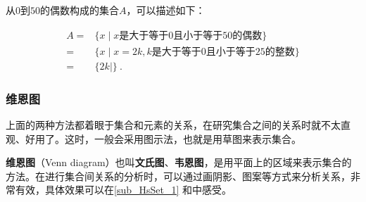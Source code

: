 

\begin{example}{}

从$0$到$50$的偶数构成的集合$A$，可以描述如下：

\begin{equation}
\begin{aligned}
A={}&\{x \mid x\text{是大于等于}0\text{且小于等于}50\text{的偶数}\}\\
={}&\{x \mid x=2k,k\text{是大于等于}0\text{且小于等于}25\text{的整数}\}\\
={}&\{2k\mid\}~.
\end{aligned}
\end{equation}
\end{example}

\subsubsection{维恩图}
上面的两种方法都着眼于集合和元素的关系，在研究集合之间的关系时就不太直观、好用了。这时，一般会采用图示法，也就是用草图来表示集合。

\textbf{维恩图}（Venn diagram）也叫\textbf{文氏图}、\textbf{韦恩图}，是用平面上的区域来表示集合的方法。在进行集合间关系的分析时，可以通过画阴影、图案等方式来分析关系，非常有效，具体效果可以在\autoref{sub_HsSet_1} 和中感受。

